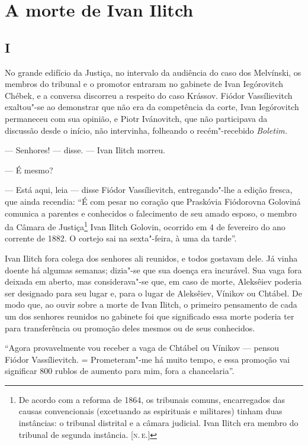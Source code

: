 \chapter{A morte de Ivan Ilitch}

\section{I}

No grande edifício da Justiça, no intervalo da audiência do caso dos
Melvínski, os membros do tribunal e o promotor entraram no gabinete de
Ivan Iegórovitch Chébek, e a conversa discorreu a respeito do caso
Krássov. Fiódor Vassílievitch exaltou"-se ao demonstrar que não era da
competência da corte, Ivan Iegórovitch permaneceu com sua opinião, e
Piotr Ivánovitch, que não participava da discussão desde o início, não
intervinha, folheando o recém"-recebido \emph{Boletim.}

--- Senhores! --- disse. --- Ivan Ilitch morreu.

--- É mesmo?

--- Está aqui, leia --- disse Fiódor Vassílievitch, entregando"-lhe a edição
fresca, que ainda recendia: ``É com pesar no coração que Praskóvia
Fiódorovna Goloviná comunica a parentes e conhecidos o falecimento de
seu amado esposo, o membro da Câmara de Justiça\footnote{De acordo com a
  reforma de 1864, os tribunais comuns, encarregados das causas
  convencionais (excetuando as espirituais e militares) tinham duas
  instâncias: o tribunal distrital e a câmara judicial. Ivan Ilitch era
  membro do tribunal de segunda instância. {[}\textsc{n.\,e.}{]}} Ivan Ilitch
Golovin, ocorrido em 4 de fevereiro do ano corrente de 1882. O cortejo
sai na sexta"-feira, à uma da tarde''.

Ivan Ilitch fora colega dos senhores ali reunidos, e todos gostavam
dele. Já vinha doente há algumas semanas; dizia"-se que sua doença era
incurável. Sua vaga fora deixada em aberto, mas considerava"-se que, em
caso de morte, Aleksêiev poderia ser designado para seu lugar e, para o
lugar de Aleksêiev, Vínikov ou Chtábel. De modo que, ao ouvir sobre a
morte de Ivan Ilitch, o primeiro pensamento de cada um dos senhores
reunidos no gabinete foi que significado essa morte poderia ter para
transferência ou promoção deles mesmos ou de seus conhecidos.

``Agora provavelmente vou receber a vaga de Chtábel ou Vínikov --- pensou
Fiódor Vassílievitch. = Prometeram"-me há muito tempo, e essa promoção
vai significar 800 rublos de aumento para mim, fora a chancelaria''.

